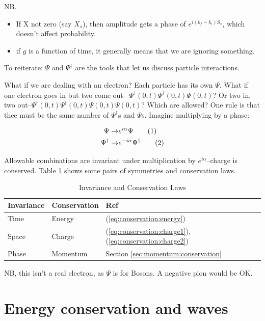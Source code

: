 \documentclass[]{article}
\newcommand\numberthis{\addtocounter{equation}{1}\tag{\theequation}}
\begin{document}
NB.\begin{itemize}
	\item  If X not zero (say $X_s$), then amplitude gets a phase of $e^{i(k_f-k_i)S_s}$, which doesn't affect probability.
	\item if $g$ is a function of time, it generally means that we are ignoring something.
\end{itemize}

To reiterate: $\Psi$ and $\Psi^\dagger$ are the tools that let us discuss particle interactions.

What if we are dealing with an electron? Each particle has its own $\Psi$. What if one electron goes in but two come out-- $\Psi^\dagger(0,t)\Psi^\dagger(0,t)\Psi(0,t)$? Or two in, two out--$\Psi^\dagger(0,t)\Psi^\dagger(0,t)\Psi(0,t)\Psi(0,t)$? Which are allowed? One rule is that thee must be the same number of $\Psi^\dagger$s and $\Psi$s. Imagine multiplying by a phase:

\begin{align*}
\Psi \rightarrow & e^{i\alpha} \Psi \numberthis \label{eq:conservation:charge1}\\
\Psi^\dagger \rightarrow & e^{-i\alpha} \Psi^\dagger \numberthis \label{eq:conservation:charge2}
\end{align*}

Allowable combinations are invariant under multiplication by $e^{i\alpha}$--charge is conserved. Table \ref{table:conserve} shows some pairs of symmetries and conservation laws.

\begin{table}[H]
	\caption{Invariance and Conservation Laws}\label{table:conserve}
	\begin{center}
			\begin{tabular}{|l|l|l|}  \hline
				Invariance&Conservation&Ref\\ \hline
				Time& Energy&(\ref{eq:conservation:energy})\\  \hline
				Space&Charge&(\ref{eq:conservation:charge1}),  (\ref{eq:conservation:charge2})\\ \hline
				Phase&Momentum&Section \ref{sec:momentum:conservation}\\ \hline
			\end{tabular}
	\end{center}
\end{table}

NB, this isn't a real electron, as $\Psi$ is for Bosons. A negative pion would be OK.


\section{Energy conservation and waves}\label{sec:energy:conservation}
\end{document}
